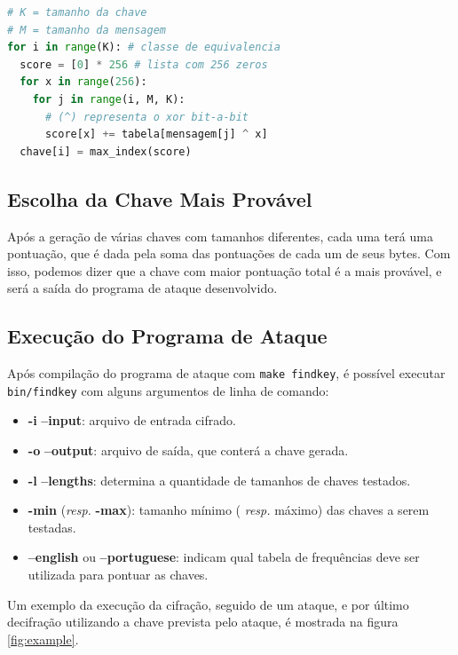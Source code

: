 \documentclass[conference]{IEEEtran}
\begin{document}
\begin{lstlisting}[language=Python, caption=Cálculo da pontuação para um tamanho
de chave K]
# K = tamanho da chave
# M = tamanho da mensagem
for i in range(K): # classe de equivalencia
  score = [0] * 256 # lista com 256 zeros
  for x in range(256):
    for j in range(i, M, K):
      # (^) representa o xor bit-a-bit
      score[x] += tabela[mensagem[j] ^ x]
  chave[i] = max_index(score)
\end{lstlisting}
\label{code:idk}

\subsection{Escolha da Chave Mais Provável}
\label{sec:escolha}
Após a geração de várias chaves com tamanhos diferentes, cada uma terá uma
pontuação, que é dada pela soma das pontuações de cada um de seus bytes. Com
isso, podemos dizer que a chave com maior pontuação total é a mais provável, e
será a saída do programa de ataque desenvolvido. 

\subsection{Execução do Programa de Ataque}
\label{sec:exec-attack}

Após compilação do programa de ataque com \verb|make findkey|, é possível
executar \verb|bin/findkey| com alguns argumentos de linha de comando:

\begin{itemize}
    \item \textbf{-i} \textbf{--input}: arquivo de entrada cifrado.
    \item \textbf{-o} \textbf{--output}: arquivo de saída, que conterá a chave
        gerada.
    \item \textbf{-l} \textbf{--lengths}: determina a quantidade de tamanhos de
        chaves testados.
    \item \textbf{-min} (\textit{resp.} \textbf{-max}): tamanho mínimo (
        \textit{resp.} máximo) das chaves a serem testadas.
    \item \textbf{--english} ou \textbf{--portuguese}: indicam qual tabela de
        frequências deve ser utilizada para pontuar as chaves.
\end{itemize}

Um exemplo da execução da cifração, seguido de um ataque, e por último
decifração utilizando a chave prevista pelo ataque, é mostrada na figura
\ref{fig:example}.
\end{document}

